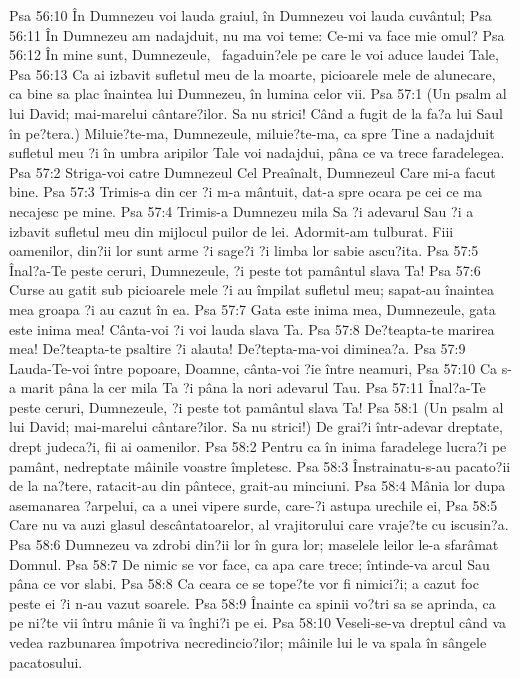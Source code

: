 Psa 56:10  În Dumnezeu voi lauda graiul, în Dumnezeu voi lauda cuvântul;
Psa 56:11  În Dumnezeu am nadajduit, nu ma voi teme: Ce-mi va face mie omul?
Psa 56:12  În mine sunt, Dumnezeule,  fagaduin?ele pe care le voi aduce laudei Tale,
Psa 56:13  Ca ai izbavit sufletul meu de la moarte, picioarele mele de alunecare, ca bine sa plac înaintea lui Dumnezeu, în lumina celor vii.
Psa 57:1  (Un psalm al lui David; mai-marelui cântare?ilor. Sa nu strici! Când a fugit de la fa?a lui Saul în pe?tera.) Miluie?te-ma, Dumnezeule, miluie?te-ma, ca spre Tine a nadajduit sufletul meu ?i în umbra aripilor Tale voi nadajdui, pâna ce va trece faradelegea.
Psa 57:2  Striga-voi catre Dumnezeul Cel Preaînalt, Dumnezeul Care mi-a facut bine.
Psa 57:3  Trimis-a din cer ?i m-a mântuit, dat-a spre ocara pe cei ce ma necajesc pe mine.
Psa 57:4  Trimis-a Dumnezeu mila Sa ?i adevarul Sau ?i a izbavit sufletul meu din mijlocul puilor de lei. Adormit-am tulburat. Fiii oamenilor, din?ii lor sunt arme ?i sage?i ?i limba lor sabie ascu?ita.
Psa 57:5  Înal?a-Te peste ceruri, Dumnezeule, ?i peste tot pamântul slava Ta!
Psa 57:6  Curse au gatit sub picioarele mele ?i au împilat sufletul meu; sapat-au înaintea mea groapa ?i au cazut în ea.
Psa 57:7  Gata este inima mea, Dumnezeule, gata este inima mea! Cânta-voi ?i voi lauda slava Ta.
Psa 57:8  De?teapta-te marirea mea! De?teapta-te psaltire ?i alauta! De?tepta-ma-voi diminea?a.
Psa 57:9  Lauda-Te-voi între popoare, Doamne, cânta-voi ?ie între neamuri,
Psa 57:10  Ca s-a marit pâna la cer mila Ta ?i pâna la nori adevarul Tau.
Psa 57:11  Înal?a-Te peste ceruri, Dumnezeule, ?i peste tot pamântul slava Ta!
Psa 58:1  (Un psalm al lui David; mai-marelui cântare?ilor. Sa nu strici!) De grai?i într-adevar dreptate, drept judeca?i, fii ai oamenilor.
Psa 58:2  Pentru ca în inima faradelege lucra?i pe pamânt, nedreptate mâinile voastre împletesc.
Psa 58:3  Înstrainatu-s-au pacato?ii de la na?tere, ratacit-au din pântece, grait-au minciuni.
Psa 58:4  Mânia lor dupa asemanarea ?arpelui, ca a unei vipere surde, care-?i astupa urechile ei,
Psa 58:5  Care nu va auzi glasul descântatoarelor, al vrajitorului care vraje?te cu iscusin?a.
Psa 58:6  Dumnezeu va zdrobi din?ii lor în gura lor; maselele leilor le-a sfarâmat Domnul.
Psa 58:7  De nimic se vor face, ca apa care trece; întinde-va arcul Sau pâna ce vor slabi.
Psa 58:8  Ca ceara ce se tope?te vor fi nimici?i; a cazut foc peste ei ?i n-au vazut soarele.
Psa 58:9  Înainte ca spinii vo?tri sa se aprinda, ca pe ni?te vii întru mânie îi va înghi?i pe ei.
Psa 58:10  Veseli-se-va dreptul când va vedea razbunarea împotriva necredincio?ilor; mâinile lui le va spala în sângele pacatosului.
